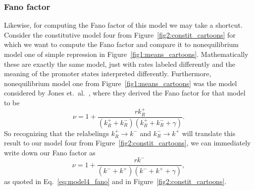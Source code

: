 \subsubsection{Fano factor}
Likewise, for computing the Fano factor of this model we may take a shortcut.
Consider the constitutive model four from Figure~\ref{fig2:constit_cartoons} for
which we want to compute the Fano factor and compare it to nonequilibrium model
one of simple repression in Figure~\ref{fig1:means_cartoons}. Mathematically
these are exactly the same model, just with rates labeled differently and the
meaning of the promoter states interpreted differently. Furthermore,
nonequilibrium model one from Figure~\ref{fig1:means_cartoons} was the model
considered by Jones et.\ al.~\cite{Jones2014}, where they derived the Fano
factor for that model to be
\begin{equation}
\nu = 1 + \frac{r k_R^+}{(k_R^+ + k_R^-)(k_R^+ + k_R^- + \gamma)}.
\end{equation}
So recognizing that the relabelings $k_R^+ \rightarrow k^-$ and
$k_R^- \rightarrow k^+$ will translate this result to our model four from
Figure~\ref{fig2:constit_cartoons}, we can immediately write down our Fano
factor as
\begin{equation}
\nu = 1 + \frac{r k^-}{(k^- + k^+)(k^- + k^+ + \gamma)},
\end{equation}
as quoted in Eq.~\ref{eq:model4_fano} and in Figure~\ref{fig2:constit_cartoons}.